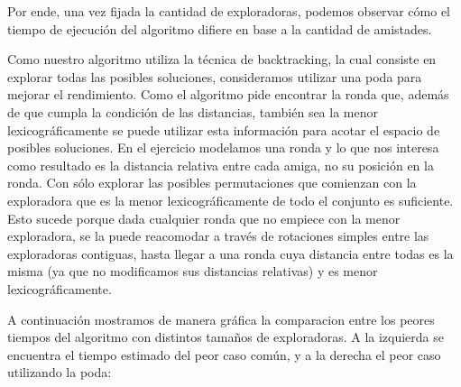 \documentclass[11pt]{article}
\begin{document}
Por ende, una vez fijada la cantidad de exploradoras, podemos observar cómo el tiempo de ejecución del algoritmo 
difiere en base a la cantidad de amistades. 

Como nuestro algoritmo utiliza la técnica de backtracking, la cual consiste en explorar todas las posibles 
soluciones, consideramos utilizar una poda para mejorar el rendimiento. Como el algoritmo pide 
encontrar la ronda que, además de que cumpla la condición de las distancias, también sea la menor lexicográficamente 
se puede utilizar esta información para acotar el espacio de posibles soluciones. En el ejercicio modelamos 
una ronda y lo que nos interesa como resultado es la distancia relativa entre cada amiga, no su posición en la ronda. 
Con sólo explorar las posibles permutaciones que comienzan con la exploradora que es la menor lexicográficamente 
de todo el conjunto es suficiente. Esto sucede porque dada cualquier ronda que no empiece con la menor exploradora, 
se la puede reacomodar a través de rotaciones simples entre las exploradoras contiguas, hasta llegar a una ronda 
cuya distancia entre todas es la misma (ya que no modificamos sus distancias relativas) y es menor lexicográficamente.

A continuación mostramos de manera gráfica la comparacion entre los peores tiempos del algoritmo con distintos tamaños de exploradoras.
A la izquierda se encuentra el tiempo estimado del peor caso común, y a la derecha el peor caso utilizando la poda:
\end{document}
